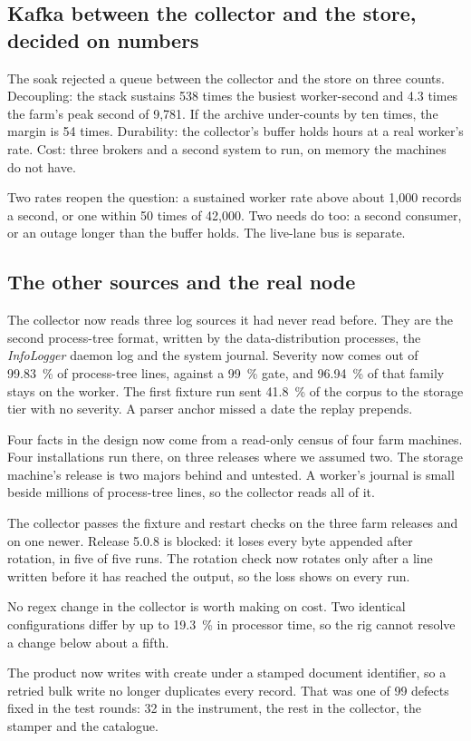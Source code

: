 \subsection{Kafka between the collector and the store, decided on numbers}\label{sec:eval-kafka}

The soak rejected a queue between the collector and the store on three counts. Decoupling: the stack sustains 538 times the busiest worker-second and 4.3 times the farm's peak second of 9,781. If the archive under-counts by ten times, the margin is 54 times. Durability: the collector's buffer holds hours at a real worker's rate. Cost: three brokers and a second system to run, on memory the machines do not have.

Two rates reopen the question: a sustained worker rate above about 1,000 records a second, or one within 50 times of 42,000. Two needs do too: a second consumer, or an outage longer than the buffer holds. The live-lane bus is separate.

\subsection{The other sources and the real node}\label{sec:eval-sources}

The collector now reads three log sources it had never read before. They are the second process-tree format, written by the data-distribution processes, the \textit{InfoLogger} daemon log and the system journal. Severity now comes out of 99.83~\% of process-tree lines, against a 99~\% gate, and 96.94~\% of that family stays on the worker. The first fixture run sent 41.8~\% of the corpus to the storage tier with no severity. A parser anchor missed a date the replay prepends.

Four facts in the design now come from a read-only census of four farm machines. Four installations run there, on three releases where we assumed two. The storage machine's release is two majors behind and untested. A worker's journal is small beside millions of process-tree lines, so the collector reads all of it.

The collector passes the fixture and restart checks on the three farm releases and on one newer. Release 5.0.8 is blocked: it loses every byte appended after rotation, in five of five runs. The rotation check now rotates only after a line written before it has reached the output, so the loss shows on every run.

No regex change in the collector is worth making on cost. Two identical configurations differ by up to 19.3~\% in processor time, so the rig cannot resolve a change below about a fifth.

The product now writes with create under a stamped document identifier, so a retried bulk write no longer duplicates every record. That was one of 99 defects fixed in the test rounds: 32 in the instrument, the rest in the collector, the stamper and the catalogue.
